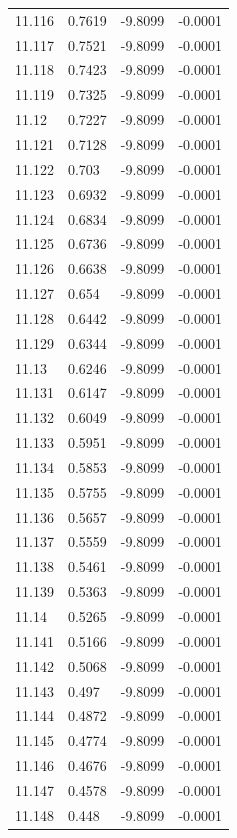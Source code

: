 \begin{tabular}{llll}
11.116 & 0.7619 & -9.8099 & -0.0001 \\
11.117 & 0.7521 & -9.8099 & -0.0001 \\
11.118 & 0.7423 & -9.8099 & -0.0001 \\
11.119 & 0.7325 & -9.8099 & -0.0001 \\
11.12 & 0.7227 & -9.8099 & -0.0001 \\
11.121 & 0.7128 & -9.8099 & -0.0001 \\
11.122 & 0.703 & -9.8099 & -0.0001 \\
11.123 & 0.6932 & -9.8099 & -0.0001 \\
11.124 & 0.6834 & -9.8099 & -0.0001 \\
11.125 & 0.6736 & -9.8099 & -0.0001 \\
11.126 & 0.6638 & -9.8099 & -0.0001 \\
11.127 & 0.654 & -9.8099 & -0.0001 \\
11.128 & 0.6442 & -9.8099 & -0.0001 \\
11.129 & 0.6344 & -9.8099 & -0.0001 \\
11.13 & 0.6246 & -9.8099 & -0.0001 \\
11.131 & 0.6147 & -9.8099 & -0.0001 \\
11.132 & 0.6049 & -9.8099 & -0.0001 \\
11.133 & 0.5951 & -9.8099 & -0.0001 \\
11.134 & 0.5853 & -9.8099 & -0.0001 \\
11.135 & 0.5755 & -9.8099 & -0.0001 \\
11.136 & 0.5657 & -9.8099 & -0.0001 \\
11.137 & 0.5559 & -9.8099 & -0.0001 \\
11.138 & 0.5461 & -9.8099 & -0.0001 \\
11.139 & 0.5363 & -9.8099 & -0.0001 \\
11.14 & 0.5265 & -9.8099 & -0.0001 \\
11.141 & 0.5166 & -9.8099 & -0.0001 \\
11.142 & 0.5068 & -9.8099 & -0.0001 \\
11.143 & 0.497 & -9.8099 & -0.0001 \\
11.144 & 0.4872 & -9.8099 & -0.0001 \\
11.145 & 0.4774 & -9.8099 & -0.0001 \\
11.146 & 0.4676 & -9.8099 & -0.0001 \\
11.147 & 0.4578 & -9.8099 & -0.0001 \\
11.148 & 0.448 & -9.8099 & -0.0001 \\

\end{tabular}
